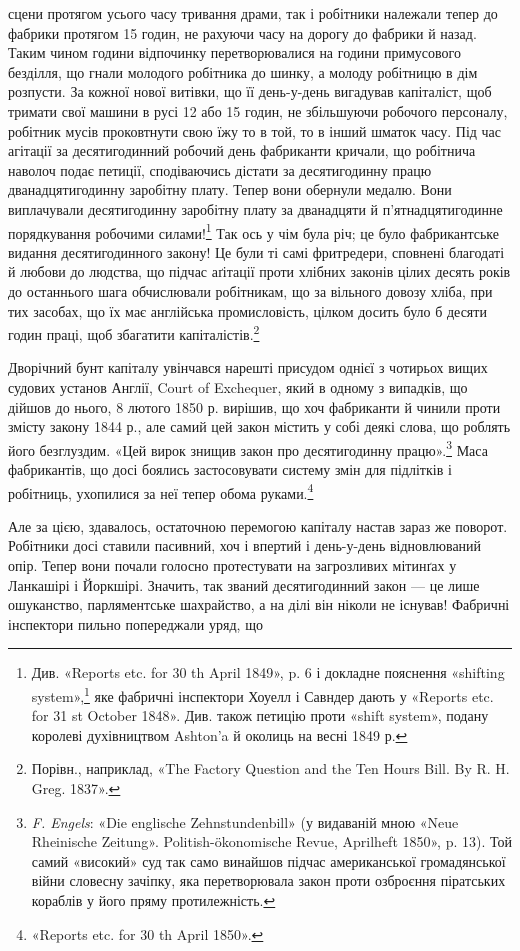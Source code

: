 \parcont{}  %
сцени протягом усього часу тривання драми, так і робітники належали
тепер до фабрики протягом 15 годин, не рахуючи часу на
дорогу до фабрики й назад. Таким чином години відпочинку перетворювалися
на години примусового безділля, що гнали молодого
робітника до шинку, а молоду робітницю в дім розпусти. За
кожної нової витівки, що її день-у-день вигадував капіталіст,
щоб тримати свої машини в русі 12 або 15 годин, не збільшуючи
робочого персоналу, робітник мусів проковтнути свою їжу то в
той, то в інший шматок часу. Під час агітації за десятигодинний
робочий день фабриканти кричали, що робітнича наволоч подає
петиції, сподіваючись дістати за десятигодинну працю дванадцятигодинну
заробітну плату. Тепер вони обернули медалю. Вони
виплачували десятигодинну заробітну плату за дванадцяти й
п’ятнадцятигодинне порядкування робочими силами!\footnote{
Див. «Reports etc. for 30 th April 1849», p. 6 і докладне пояснення
«shifting system»,\footnote*{
— системи пересувань. \emph{Ред.}
} яке фабричні інспектори Хоуелл і Савндер дають
у «Reports etc. for 31 st October 1848». Див. також петицію проти
«shift system», подану королеві духівництвом Ashton’a й околиць на весні
1849 р.
} Так ось
у чім була річ; це було фабрикантське видання десятигодинного
закону! Це були ті самі фритредери, сповнені благодаті й любови
до людства, що підчас аґітації проти хлібних законів цілих десять
років до останнього шага обчислювали робітникам, що за вільного
довозу хліба, при тих засобах, що їх має англійська промисловість,
цілком досить було б десяти годин праці, щоб збагатити
капіталістів.\footnote{
Порівн., наприклад, «The Factory Question and the Ten Hours
Bill. By R. H. Greg. 1837».
}

Дворічний бунт капіталу увінчався нарешті присудом однієї
з чотирьох вищих судових установ Англії, Court of Exchequer,
який в одному з випадків, що дійшов до нього, 8 лютого 1850 р.
вирішив, що хоч фабриканти й чинили проти змісту закону
1844 р., але самий цей закон містить у собі деякі слова, що роблять
його безглуздим. «Цей вирок знищив закон про десятигодинну
працю».\footnote{
\emph{F. Engels}: «Die englische Zehnstundenbill» (у видаваній мною
«Neue Rheinische Zeitung». Politish-ökonomische Revue, Aprilheft
1850», p. 13). Той самий «високий» суд так само винайшов підчас американської
громадянської війни словесну зачіпку, яка перетворювала закон
проти озброєння піратських кораблів у його пряму протилежність.
} Маса фабрикантів, що досі боялись застосовувати
систему змін для підлітків і робітниць, ухопилися за неї тепер
обома руками.\footnote{
«Reports etc. for 30 th April 1850».
}

Але за цією, здавалось, остаточною перемогою капіталу
настав зараз же поворот. Робітники досі ставили пасивний, хоч
і впертий і день-у-день відновлюваний опір. Тепер вони почали
голосно протестувати на загрозливих мітинґах у Ланкашірі і
Йоркшірі. Значить, так званий десятигодинний закон — це лише
ошуканство, парляментське шахрайство, а на ділі він ніколи не
існував! Фабричні інспектори пильно попереджали уряд, що
\parbreak{}  %
